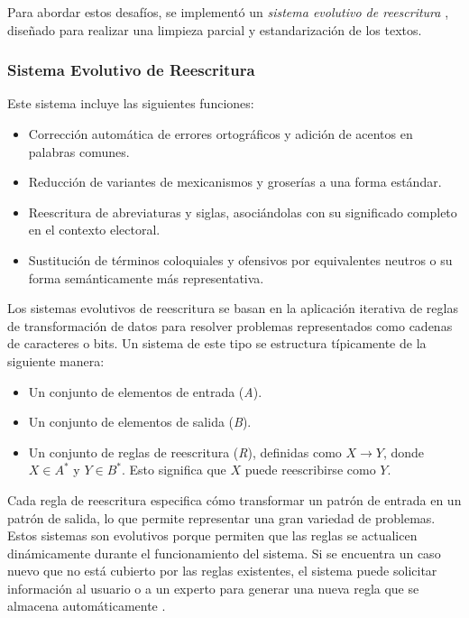\documentclass[10pt, a4paper]{article}
\begin{document}
	Para abordar estos desafíos, se implementó un \textit{sistema evolutivo de reescritura} \parencite{galindo1991sistemas}, diseñado para realizar una limpieza parcial y estandarización de los textos. 
	
	\subsubsection{Sistema Evolutivo de Reescritura}
	
	Este sistema incluye las siguientes funciones:
	\begin{itemize}
		\item Corrección automática de errores ortográficos y adición de acentos en palabras comunes.
		\item Reducción de variantes de mexicanismos y groserías a una forma estándar.
		\item Reescritura de abreviaturas y siglas, asociándolas con su significado completo en el contexto electoral.
		\item Sustitución de términos coloquiales y ofensivos por equivalentes neutros o su forma semánticamente más representativa.
	\end{itemize}
	
	Los sistemas evolutivos de reescritura se basan en la aplicación iterativa de reglas de transformación de datos para resolver problemas representados como cadenas de caracteres o bits. Un sistema de este tipo se estructura típicamente de la siguiente manera:
	
	\begin{itemize}
		\item Un conjunto de elementos de entrada (\textit{A}).
		\item Un conjunto de elementos de salida (\textit{B}).
		\item Un conjunto de reglas de reescritura (\textit{R}), definidas como $X \rightarrow Y$, donde $X \in A^*$ y $Y \in B^*$. Esto significa que $X$ puede reescribirse como $Y$.
	\end{itemize}
	
	Cada regla de reescritura especifica cómo transformar un patrón de entrada en un patrón de salida, lo que permite representar una gran variedad de problemas. Estos sistemas son evolutivos porque permiten que las reglas se actualicen dinámicamente durante el funcionamiento del sistema. Si se encuentra un caso nuevo que no está cubierto por las reglas existentes, el sistema puede solicitar información al usuario o a un experto para generar una nueva regla que se almacena automáticamente \parencite{galindo1991sistemas}.
	
\end{document}
